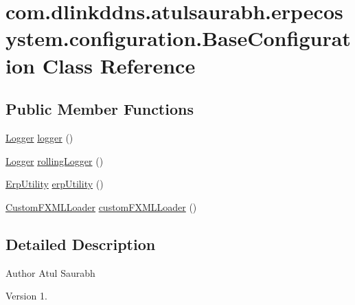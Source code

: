 \hypertarget{classcom_1_1dlinkddns_1_1atulsaurabh_1_1erpecosystem_1_1configuration_1_1_base_configuration}{}\section{com.\+dlinkddns.\+atulsaurabh.\+erpecosystem.\+configuration.\+Base\+Configuration Class Reference}
\label{classcom_1_1dlinkddns_1_1atulsaurabh_1_1erpecosystem_1_1configuration_1_1_base_configuration}
\subsection*{Public Member Functions}
\begin{DoxyCompactItemize}
\item 
\mbox{\hyperlink{interfacecom_1_1dlinkddns_1_1atulsaurabh_1_1erpecosystem_1_1logger_1_1_logger}{Logger}} \mbox{\hyperlink{classcom_1_1dlinkddns_1_1atulsaurabh_1_1erpecosystem_1_1configuration_1_1_base_configuration_a1e3b30da635356fabf646a14241b116d}{logger}} ()
\item 
\mbox{\hyperlink{interfacecom_1_1dlinkddns_1_1atulsaurabh_1_1erpecosystem_1_1logger_1_1_logger}{Logger}} \mbox{\hyperlink{classcom_1_1dlinkddns_1_1atulsaurabh_1_1erpecosystem_1_1configuration_1_1_base_configuration_ab280a65420b19fb7b76218a39ab6db67}{rolling\+Logger}} ()
\item 
\mbox{\hyperlink{interfacecom_1_1dlinkddns_1_1atulsaurabh_1_1erpecosystem_1_1util_1_1_erp_utility}{Erp\+Utility}} \mbox{\hyperlink{classcom_1_1dlinkddns_1_1atulsaurabh_1_1erpecosystem_1_1configuration_1_1_base_configuration_ac854d5f3ef3af3b9d6d219808815d396}{erp\+Utility}} ()
\item 
\mbox{\hyperlink{classcom_1_1dlinkddns_1_1atulsaurabh_1_1erpecosystem_1_1loader_1_1_custom_f_x_m_l_loader}{Custom\+F\+X\+M\+L\+Loader}} \mbox{\hyperlink{classcom_1_1dlinkddns_1_1atulsaurabh_1_1erpecosystem_1_1configuration_1_1_base_configuration_ad02c1d56c9b4481c9011b4c3825dd10a}{custom\+F\+X\+M\+L\+Loader}} ()
\end{DoxyCompactItemize}


\subsection{Detailed Description}
\begin{DoxyAuthor}{Author}
Atul Saurabh 
\end{DoxyAuthor}
\begin{DoxyVersion}{Version}
1. 
\end{DoxyVersion}


